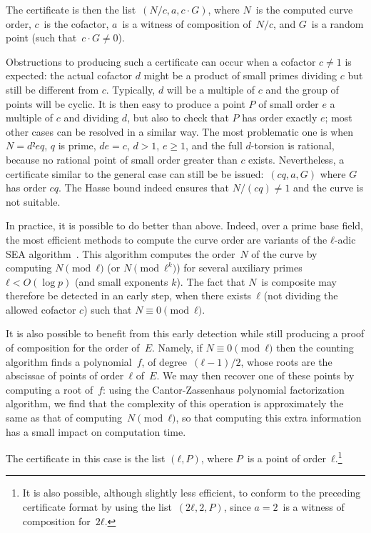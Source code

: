 \documentclass[twocolumn,letterpaper,10pt]{article}
\begin{document}
The certificate is then the list~$(N/c, a, c · G)$,
where $N$~is the computed curve order, $c$~is the cofactor,
$a$~is a witness of composition of~$N/c$,
and $G$~is a random point (such that~$c · G ≠ 0$).

\smallskip

Obstructions to producing such a certificate can occur
when a cofactor $c \neq 1$ is expected:
the actual cofactor $d$ might be a product of small primes dividing $c$
but still be different from $c$.
Typically, $d$ will be a multiple of $c$
and the group of points will be cyclic.
It is then easy to produce a point $P$ of small order $e$
a multiple of $c$ and dividing $d$, but also
to check that $P$ has order exactly $e$;
most other cases can be resolved in a similar way.
The most problematic one is when $N = d² e q$, $q$ is prime,
$d e = c$, $d > 1$, $e \geq 1$,
and the full $d$-torsion is rational,
because no rational point of small order greater than $c$ exists.
Nevertheless, a certificate similar
to the general case can still be be issued:~$(c q, a, G)$
where $G$ has order $c q$.
The Hasse bound indeed ensures that $N / (cq) \neq 1$
and the curve is not suitable.

\smallskip

In practice, it is possible to do better than above.
Indeed, over a prime base field,
the most efficient methods to compute the curve order are
variants of the $ℓ$-adic SEA algorithm~\cite{mc1985schoof,
jtnb1995schoof,smf2008cl}.
This algorithm computes the order~$N$ of the curve
by computing $N \pmod{ℓ}$ (or $N \pmod{ℓ^k}$) for several
auxiliary primes~$ℓ < O(\log p)$ (and small exponents $k$).
The fact that $N$~is composite may therefore be detected
in an early step,
when there exists~$ℓ$ (not dividing the allowed cofactor $c$)
such that $N ≡ 0 \pmod{ℓ}$.

It is also possible to benefit from this early detection
while still producing a proof of composition for the order of~$E$.
Namely, if $N ≡ 0 \pmod{ℓ}$ then
the counting algorithm finds a polynomial~$f$, of degree~$(ℓ-1)/2$,
whose roots are the abscissae of points of order~$ℓ$ of~$E$.
We may then recover one of these points by
computing a root of~$f$:
using the Cantor-Zassenhaus polynomial factorization algorithm,
we find that the complexity of this operation
is approximately the same as that of computing~$N \pmod{ℓ}$,
so that computing this extra information
has a small impact on computation time.

The certificate in this case is the list $(ℓ, P)$,
where $P$~is a point of order~$ℓ$.\footnote{%
It is also possible, although slightly less efficient,
to conform to the preceding certificate format
by using the list~$(2 ℓ, 2, P)$,
since $a = 2$~is a witness of composition for~$2ℓ$.}
\end{document}
